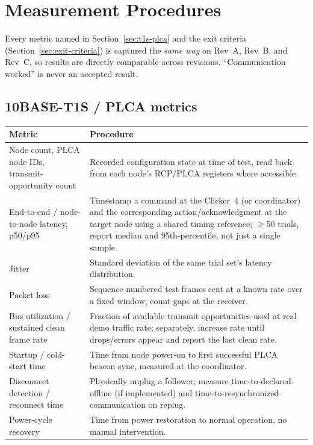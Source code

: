 \section{Measurement Procedures}
\label{sec:measurement}

Every metric named in Section~\ref{sec:t1s-plca} and the exit criteria (Section~\ref{sec:exit-criteria}) is captured the \emph{same way} on Rev~A, Rev~B, and Rev~C, so results are directly comparable across revisions. ``Communication worked'' is never an accepted result.

\subsection{10BASE-T1S / PLCA metrics}

\begin{center}
\small
\begin{tabularx}{\linewidth}{@{}p{3.4cm} X@{}}
\toprule
\textbf{Metric} & \textbf{Procedure} \\
\midrule
Node count, PLCA node IDs, transmit-opportunity count & Recorded configuration state at time of test, read back from each node's RCP/PLCA registers where accessible. \\
End-to-end / node-to-node latency, p50/p95 & Timestamp a command at the Clicker~4 (or coordinator) and the corresponding action/acknowledgment at the target node using a shared timing reference; $\geq$50 trials, report median and 95th-percentile, not just a single sample. \\
Jitter & Standard deviation of the same trial set's latency distribution. \\
Packet loss & Sequence-numbered test frames sent at a known rate over a fixed window; count gaps at the receiver. \\
Bus utilization / sustained clean frame rate & Fraction of available transmit opportunities used at real demo traffic rate; separately, increase rate until drops/errors appear and report the last clean rate. \\
Startup / cold-start time & Time from node power-on to first successful PLCA beacon sync, measured at the coordinator. \\
Disconnect detection / reconnect time & Physically unplug a follower; measure time-to-declared-offline (if implemented) and time-to-resynchronized-communication on replug. \\
Power-cycle recovery & Time from power restoration to normal operation, no manual intervention. \\

\end{tabularx}
\end{center}
